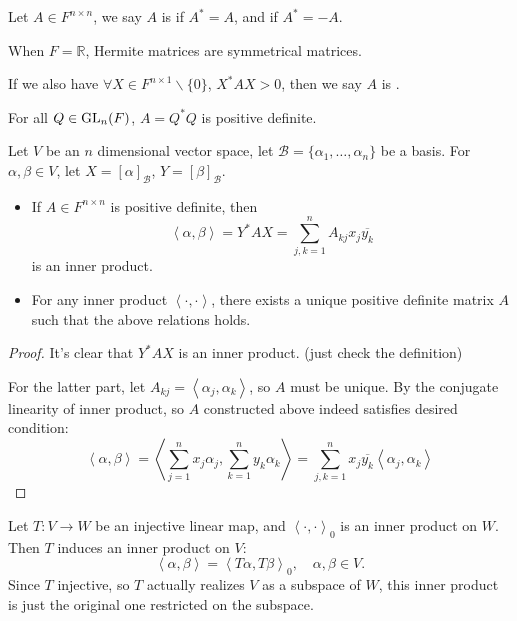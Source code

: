 \begin{definition}
	Let $A \in F^{n\times n}$, we say $A$ is  if
	$A^* = A$, and  if $A^* = -A$.

	When $F = \mathbb{R}$, Hermite matrices are symmetrical matrices.

	If we also have $\forall X\in F^{n\times 1}\backslash\{0\}$, $X^*AX > 0$,
	then we say $A$ is .
\end{definition}

\begin{example}
    For all $Q \in \mathrm{GL}_n(F)$, $A = Q^*Q$ is positive definite.
\end{example}

\begin{proposition}
	Let $V$ be an $n$ dimensional vector space,
	let $\mathcal{B} = \{\alpha_1,\dots,\alpha_n\}$ be a basis.
	For $\alpha, \beta\in V$, let $X = [\alpha]_{\mathcal{B}}$,
	$Y = [\beta]_{\mathcal{B}}$.
	\begin{itemize}
		\item If $A\in F^{n\times n}$ is positive definite, then
			\[
			\left<\alpha,\beta \right> = Y^*AX
			= \sum_{j,k=1}^{n} A_{kj}x_j \overline{y_k}
			\]
			is an inner product.
		\item For any inner product $ \left<\cdot,\cdot \right>$,
			there exists a unique positive definite matrix $A$ such
			that the above relations holds.
	\end{itemize}
\end{proposition}
\begin{proof}[Proof]
    It's clear that $Y^*AX$ is an inner product. (just check the definition)

	For the latter part, let $A_{kj} = \left<\alpha_j, \alpha_k\right>$,
	so $A$ must be unique.
	By the conjugate linearity of inner product, so $A$ constructed
	above indeed satisfies desired condition:
	\[
	\left<\alpha, \beta \right>
	= \left<\sum_{j=1}^{n} x_j\alpha_j, \sum_{k=1}^{n} y_k\alpha_k \right>
	= \sum_{j,k=1}^{n} x_j \overline{y_k} \left<\alpha_j, \alpha_k \right>
	\]
\end{proof}

Let $T: V\to W$ be an injective linear map, and $ \left<\cdot, \cdot \right>_0$
is an inner product on $W$. Then $T$ induces an inner product on $V$:
\[
\left<\alpha, \beta \right> = \left<T\alpha, T\beta \right>_0,
\quad \alpha, \beta\in V.
\]
Since $T$ injective, so $T$ actually realizes $V$ as a subspace of $W$,
this inner product is just the original one restricted on the subspace.

